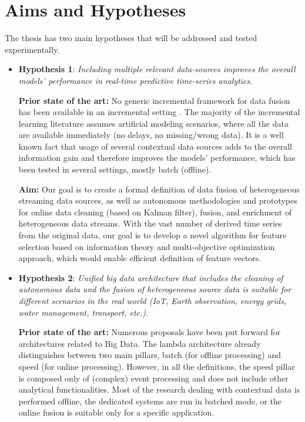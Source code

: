 \section{Aims and Hypotheses}

\noindent The thesis has two main hypotheses that will be addressed and tested experimentally.

\begin{itemize}
    \item \textbf{Hypothesis 1}: \textit{Including multiple relevant data-sources improves the overall models’ performance in real-time predictive time-series analytics.} 
    
    \textbf{Prior state of the art:}
    No generic incremental framework for data fusion has been available in an incremental setting \cite{kenda:2019:fusion}.
    The majority of the incremental learning literature assumes artificial modeling scenarios, where all the data are available immediately (no delays, no missing/wrong data).
    It is a well known fact that usage of several contextual data sources adds to the overall information gain and therefore improves the models' performance, which has been tested in several settings, mostly batch (offline).
    
    \textbf{Aim:} 
    Our goal is to create a formal definition of data fusion of heterogeneous streaming data sources, as well as autonomous methodologies and prototypes for online data cleaning (based on Kalman filter), fusion, and enrichment of heterogeneous data streams. 
    With the vast number of derived time series from the original data, our goal is to develop a novel algorithm for feature selection based on information theory and multi-objective optimization approach, which would enable efficient definition of feature vectors.
    
    \item \textbf{Hypothesis 2}: \textit{Unified big data architecture that includes the cleaning of autonomous data and the fusion of heterogeneous source data is suitable for different scenarios in the real world (IoT, Earth observation, energy grids, water management, transport, etc.).}

    \textbf{Prior state of the art:}
    Numerous proposals have been put forward for architectures related to Big Data.
    The lambda architecture already distinguishes between two main pillars, batch (for offline processing) and speed (for online processing).
    However, in all the definitions, the speed pillar is composed only of (complex) event processing and does not include other analytical functionalities.
    Most of the research dealing with contextual data is performed offline, the dedicated systems are run in batched mode, or the online fusion is suitable only for a specific application.
    

\end{itemize}
